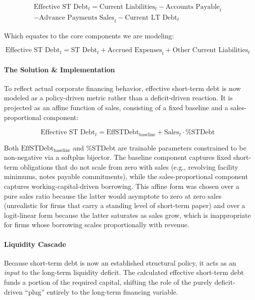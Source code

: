 \documentclass[12pt,a4paper]{article}
\begin{document}
\begin{multline}\label{eq:eff_st_debt_identity}
\text{Effective ST Debt}_t = \text{Current Liabilities}_t - \text{Accounts Payable}_t \\
- \text{Advance Payments Sales}_t - \text{Current LT Debt}_t
\end{multline}

Which equates to the core components we are modeling:

\begin{equation}\label{eq:eff_st_debt_components}
\text{Effective ST Debt}_t = \text{ST Debt}_t + \text{Accrued Expenses}_t + \text{Other Current Liabilities}_t
\end{equation}

\paragraph{The Solution \& Implementation}

To reflect actual corporate financing behavior, effective short-term
debt is now modeled as a policy-driven metric rather than a
deficit-driven reaction. It is projected as an affine function of
sales, consisting of a fixed baseline and a sales-proportional
component:

\begin{equation}\label{eq:eff_st_debt_calc}
\text{Effective ST Debt}_t = \text{EffSTDebt}_{\text{baseline}} + \text{Sales}_t \cdot \text{\%STDebt}
\end{equation}

Both $\text{EffSTDebt}_{\text{baseline}}$ and \%STDebt are trainable
parameters constrained to be non-negative via a softplus bijector. The
baseline component captures fixed short-term obligations that do not
scale from zero with sales (e.g., revolving facility minimums, notes
payable commitments), while the sales-proportional component captures
working-capital-driven borrowing. This affine form was chosen over a
pure sales ratio because the latter would asymptote to zero at zero
sales (unrealistic for firms that carry a standing level of short-term
paper) and over a logit-linear form because the latter saturates as
sales grow, which is inappropriate for firms whose borrowing scales
proportionally with revenue.

\paragraph{Liquidity Cascade} Because short-term debt is now an
  established structural policy, it acts as an \emph{input} to the
  long-term liquidity deficit. The calculated effective short-term debt
  funds a portion of the required capital, shifting the role of the
  purely deficit-driven ``plug'' entirely to the long-term financing
  variable.
\end{document}

